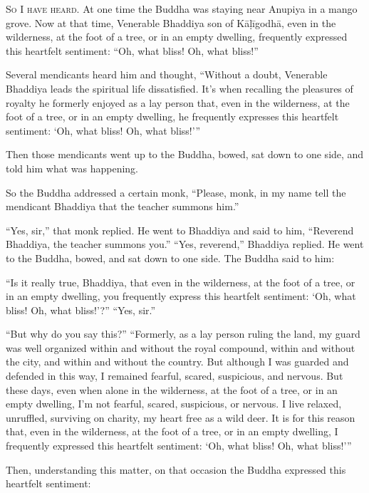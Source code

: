 \documentclass[12pt,openany]{book}%
\newcommand*{\scevam}[1]{\textsc{#1}}
\begin{document}
\scevam{So I have heard. }At one time the Buddha was staying near Anupiya in a mango grove. Now at that time, Venerable Bhaddiya son of \textsanskrit{Kāḷīgodhā}, even in the wilderness, at the foot of a tree, or in an empty dwelling, frequently expressed this heartfelt sentiment: “Oh, what bliss! Oh, what bliss!” 

Several mendicants heard him and thought, “Without a doubt, Venerable Bhaddiya leads the spiritual life dissatisfied. It’s when recalling the pleasures of royalty he formerly enjoyed as a lay person that, even in the wilderness, at the foot of a tree, or in an empty dwelling, he frequently expresses this heartfelt sentiment: ‘Oh, what bliss! Oh, what bliss!’” 

Then those mendicants went up to the Buddha, bowed, sat down to one side, and told him what was happening. 

So the Buddha addressed a certain monk, “Please, monk, in my name tell the mendicant Bhaddiya that the teacher summons him.” 

“Yes, sir,” that monk replied. He went to Bhaddiya and said to him, “Reverend Bhaddiya, the teacher summons you.” “Yes, reverend,” Bhaddiya replied. He went to the Buddha, bowed, and sat down to one side. The Buddha said to him: 

“Is it really true, Bhaddiya, that even in the wilderness, at the foot of a tree, or in an empty dwelling, you frequently express this heartfelt sentiment: ‘Oh, what bliss! Oh, what bliss!’?” “Yes, sir.” 

“But why do you say this?” “Formerly, as a lay person ruling the land, my guard was well organized within and without the royal compound, within and without the city, and within and without the country. But although I was guarded and defended in this way, I remained fearful, scared, suspicious, and nervous. But these days, even when alone in the wilderness, at the foot of a tree, or in an empty dwelling, I’m not fearful, scared, suspicious, or nervous. I live relaxed, unruffled, surviving on charity, my heart free as a wild deer. It is for this reason that, even in the wilderness, at the foot of a tree, or in an empty dwelling, I frequently expressed this heartfelt sentiment: ‘Oh, what bliss! Oh, what bliss!’” 

Then, understanding this matter, on that occasion the Buddha expressed this heartfelt sentiment: 
\end{document}
